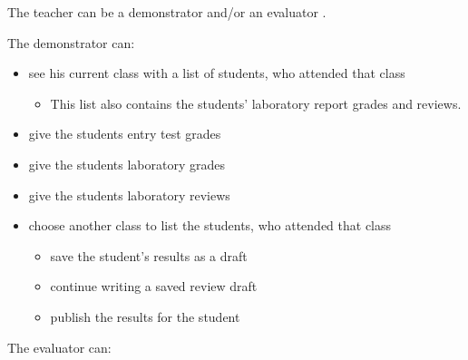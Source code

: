The teacher can be a demonstrator and/or an evaluator . 


The demonstrator can:

\begin{itemize}
	\item see his current class with a list of students, who attended that class
	\begin{itemize}
		\item This list also contains the students' laboratory report grades and reviews.
	\end{itemize}
	\item give the students entry test grades
	\item give the students laboratory grades
	\item give the students laboratory reviews
	\item choose another class to list the students, who attended that class
	\begin{itemize}
		\item save the student's results as a draft
		\item continue writing a saved review draft
		\item publish the results for the student
	\end{itemize}
\end{itemize}


The evaluator can:

